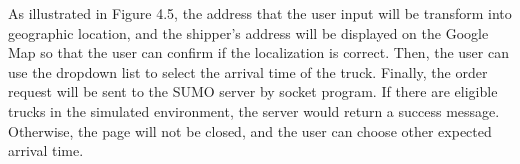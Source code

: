 \documentclass[12pt]{ksthesis}
\begin{document}
\begin{thesis}
{As illustrated in Figure 4.5, the address that the user input will be transform into geographic location, and the shipper’s address will be displayed on the Google Map so that the user can confirm if the localization is correct. Then, the user can use the dropdown list to select the arrival time of the truck. 
Finally, the order request will be sent to the SUMO server by socket program. If there are eligible trucks in the simulated environment, the server would return a success message. Otherwise, the page will not be closed, and the user can choose other expected arrival time.  

\begin{figure}[H]
\centering  %


\end{figure}}
\end{thesis}
\end{document}
